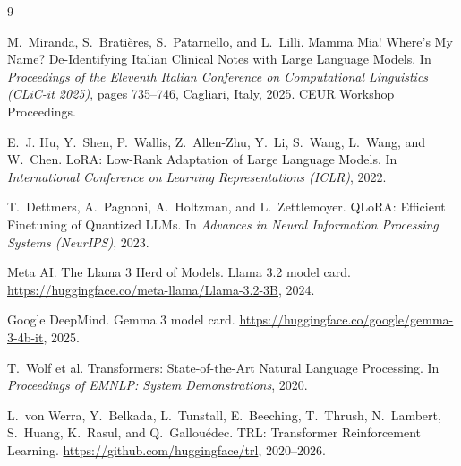 \documentclass[11pt,a4paper]{article}
\begin{document}
\begin{thebibliography}{9}

M.~Miranda, S.~Bratières, S.~Patarnello, and L.~Lilli.
\newblock Mamma Mia! Where's My Name? De-Identifying Italian Clinical Notes with Large Language Models.
\newblock In \emph{Proceedings of the Eleventh Italian Conference on Computational Linguistics (CLiC-it 2025)}, pages 735--746, Cagliari, Italy, 2025. CEUR Workshop Proceedings.

E.~J. Hu, Y.~Shen, P.~Wallis, Z.~Allen-Zhu, Y.~Li, S.~Wang, L.~Wang, and W.~Chen.
\newblock LoRA: Low-Rank Adaptation of Large Language Models.
\newblock In \emph{International Conference on Learning Representations (ICLR)}, 2022.

T.~Dettmers, A.~Pagnoni, A.~Holtzman, and L.~Zettlemoyer.
\newblock QLoRA: Efficient Finetuning of Quantized LLMs.
\newblock In \emph{Advances in Neural Information Processing Systems (NeurIPS)}, 2023.

Meta AI.
\newblock The Llama 3 Herd of Models. Llama 3.2 model card.
\newblock \url{https://huggingface.co/meta-llama/Llama-3.2-3B}, 2024.

Google DeepMind.
\newblock Gemma 3 model card.
\newblock \url{https://huggingface.co/google/gemma-3-4b-it}, 2025.

T.~Wolf et al.
\newblock Transformers: State-of-the-Art Natural Language Processing.
\newblock In \emph{Proceedings of EMNLP: System Demonstrations}, 2020.

L.~von Werra, Y.~Belkada, L.~Tunstall, E.~Beeching, T.~Thrush, N.~Lambert, S.~Huang, K.~Rasul, and Q.~Gallouédec.
\newblock TRL: Transformer Reinforcement Learning.
\newblock \url{https://github.com/huggingface/trl}, 2020--2026.

\end{thebibliography}
\end{document}
